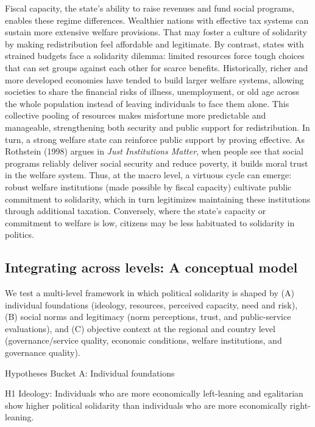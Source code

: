 \documentclass[12pt]{article}
\begin{document}
Fiscal capacity, the state's ability to raise revenues and fund social
programs, enables these regime differences. Wealthier nations with
effective tax systems can sustain more extensive welfare provisions.
That may foster a culture of solidarity by making redistribution feel
affordable and legitimate. By contrast, states with strained budgets
face a solidarity dilemma: limited resources force tough choices that
can set groups against each other for scarce benefits. Historically,
richer and more developed economies have tended to build larger welfare
systems, allowing societies to share the financial risks of illness,
unemployment, or old age across the whole population instead of leaving
individuals to face them alone. This collective pooling of resources
makes misfortune more predictable and manageable, strengthening both
security and public support for redistribution. In turn, a strong
welfare state can reinforce public support by proving effective. As
Rothstein (1998) argues in \emph{Just Institutions Matter}, when people
see that social programs reliably deliver social security and reduce
poverty, it builds moral trust in the welfare system. Thus, at the macro
level, a virtuous cycle can emerge: robust welfare institutions (made
possible by fiscal capacity) cultivate public commitment to solidarity,
which in turn legitimizes maintaining these institutions through
additional taxation. Conversely, where the state's capacity or
commitment to welfare is low, citizens may be less habituated to
solidarity in politics.

\subsection{Integrating across levels: A conceptual
model}\label{integrating-across-levels-a-conceptual-model}

We test a multi-level framework in which political solidarity is shaped
by (A) individual foundations (ideology, resources, perceived capacity,
need and risk), (B) social norms and legitimacy (norm perceptions,
trust, and public-service evaluations), and (C) objective context at the
regional and country level (governance/service quality, economic
conditions, welfare institutions, and governance quality).

Hypotheses Bucket A: Individual foundations

H1 Ideology: Individuals who are more economically left-leaning and
egalitarian show higher political solidarity than individuals who are
more economically right-leaning.
\end{document}
